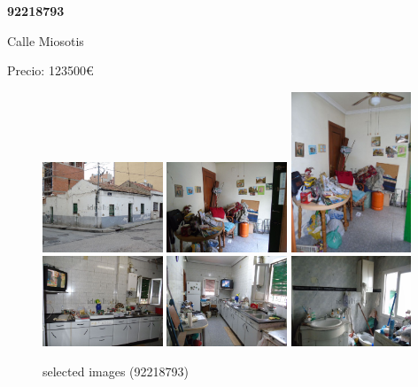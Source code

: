\documentclass[10pt,a4paper]{report}
\begin{document}
\newpage
\begin{center}
\begin{large}
\textbf{92218793}\\[10px]
\end{large}
Calle Miosotis
\end{center}
Precio: 123500€
\begin{figure}[htbp]

\includegraphics[width=0.32\textwidth]{arfima/92218793/92218793-001.jpg}
\includegraphics[width=0.32\textwidth]{arfima/92218793/92218793-002.jpg}
\includegraphics[width=0.32\textwidth]{arfima/92218793/92218793-003.jpg}
\includegraphics[width=0.32\textwidth]{arfima/92218793/92218793-004.jpg}
\includegraphics[width=0.32\textwidth]{arfima/92218793/92218793-005.jpg}
\includegraphics[width=0.32\textwidth]{arfima/92218793/92218793-006.jpg}
\caption{selected images (92218793)}
\end{figure}
\end{document}
